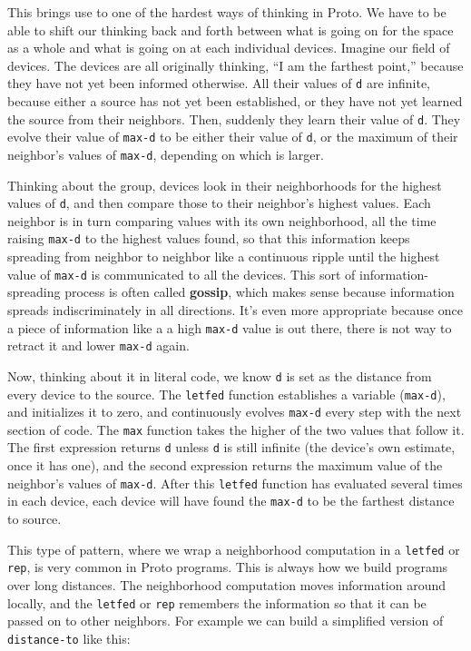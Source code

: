 \documentclass{article}
\newcommand\var[1]{{\tt #1}}
\begin{document}
This brings use to one of the hardest ways of thinking in Proto.  We
have to be able to shift our thinking back and forth between what is
going on for the space as a whole and what is going on at each
individual devices.  Imagine our field of devices. The devices are all
originally thinking, ``I am the farthest point,'' because they have
not yet been informed otherwise.  All their values of \var{d} are
infinite, because either a source has not yet been established, or
they have not yet learned the source from their neighbors.  Then,
suddenly they learn their value of \var{d}.  They evolve their value
of \var{max-d} to be either their value of \var{d}, or the maximum of
their neighbor's values of \var{max-d}, depending on which is larger.

Thinking about the group, devices look in their neighborhoods for the
highest values of \var{d}, and then compare those to their neighbor's
highest values.  Each neighbor is in turn comparing values with its
own neighborhood, all the time raising \var{max-d} to the highest
values found, so that this information keeps spreading from neighbor
to neighbor like a continuous ripple until the highest value of
\var{max-d} is communicated to all the devices.  This sort of
information-spreading process is often called {\bf gossip}, which
makes sense because information spreads indiscriminately in all
directions.  It's even more appropriate because once a piece of
information like a a high \var{max-d} value is out there, there is not
way to retract it and lower \var{max-d} again.

Now, thinking about it in literal code, we know \var{d} is set as the
distance from every device to the source.  The \var{letfed} function
establishes a variable (\var{max-d}), and initializes it to zero, and
continuously evolves \var{max-d} every step with the next section of
code.  The \var{max} function takes the higher of the two values that
follow it.  The first expression returns \var{d} unless \var{d} is
still infinite (the device's own estimate, once it has one), and the
second expression returns the maximum value of the neighbor's values
of \var{max-d}.  After this \var{letfed} function has evaluated
several times in each device, each device will have found the
\var{max-d} to be the farthest distance to source.  

This type of pattern, where we wrap a neighborhood computation in a
\var{letfed} or \var{rep}, is very common in Proto programs.  This is
always how we build programs over long distances.  The neighborhood
computation moves information around locally, and the \var{letfed} or
\var{rep} remembers the information so that it can be passed on to
other neighbors.  For example we can build a simplified version of
\var{distance-to} like this:
\end{document}
